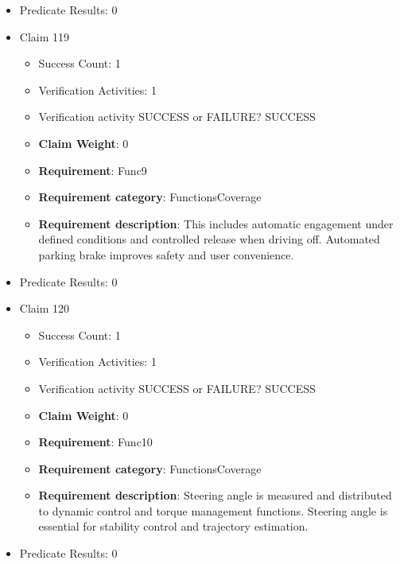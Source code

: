 \documentclass{article}
\begin{document}
\begin{itemize}
\begin{itemize}
				\end{itemize}
				
									    
				\item Predicate Results: 0

  				  \item Claim 119
				\begin{itemize}
			    	\item Success Count: 1 
			    	\item Verification Activities: 1
					\item Verification activity SUCCESS or FAILURE? SUCCESS
					\item \textbf{Claim Weight}: 0
						\item \textbf{Requirement}: Func9 
						\item \textbf{Requirement category}: FunctionsCoverage 
						\item \textbf{Requirement description}: This includes automatic engagement under defined conditions and controlled release when driving off. Automated parking brake improves safety and user convenience.
					
				\end{itemize}
				
									    
				\item Predicate Results: 0

  				  \item Claim 120
				\begin{itemize}
			    	\item Success Count: 1 
			    	\item Verification Activities: 1
					\item Verification activity SUCCESS or FAILURE? SUCCESS
					\item \textbf{Claim Weight}: 0
						\item \textbf{Requirement}: Func10 
						\item \textbf{Requirement category}: FunctionsCoverage 
						\item \textbf{Requirement description}: Steering angle is measured and distributed to dynamic control and torque management functions. Steering angle is essential for stability control and trajectory estimation.
					
				\end{itemize}
				
									    
				\item Predicate Results: 0


\end{itemize}
\end{document}
